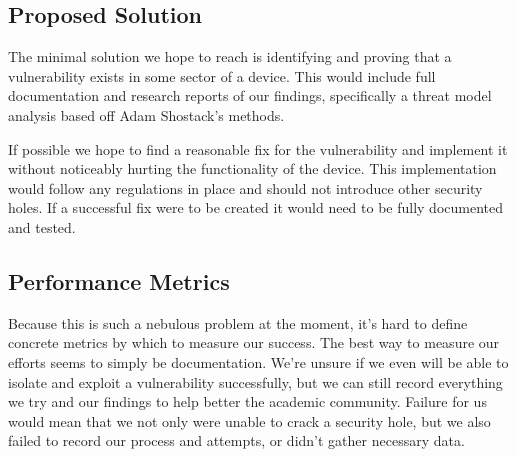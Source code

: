 \documentclass[IEEEtran,letterpaper,10pt,titlepage,draftclsnofoot,onecolumn]{article}
\begin{document}
\subsection*{Proposed Solution}
The minimal solution we hope to reach is identifying and proving that a vulnerability exists in some sector of a device.
This would include full documentation and research reports of our findings, specifically a threat model analysis based off Adam Shostack's methods. \cite[p.203]{TMDS}

If possible we hope to find a reasonable fix for the vulnerability and implement it without noticeably hurting the functionality of the device.
This implementation would follow any regulations in place and should not introduce other security holes.
If a successful fix were to be created it would need to be fully documented and tested.

\subsection*{Performance Metrics}
Because this is such a nebulous problem at the moment, it's hard to define concrete metrics by which to measure our success.
The best way to measure our efforts seems to simply be documentation.
We're unsure if we even will be able to isolate and exploit a vulnerability successfully, but we can still record everything we try and our findings to help better the academic community. 
Failure for us would mean that we not only were unable to crack a security hole, but we also failed to record our process and attempts, or didn't gather necessary data.

\newpage




\end{document}
